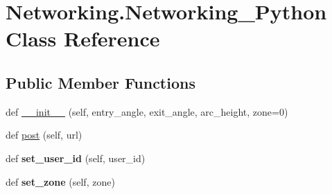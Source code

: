 \hypertarget{classNetworking_1_1Networking__Python}{}\section{Networking.\+Networking\+\_\+\+Python Class Reference}
\label{classNetworking_1_1Networking__Python}
\subsection*{Public Member Functions}
\begin{DoxyCompactItemize}
\item 
def \hyperlink{classNetworking_1_1Networking__Python_ad8b3ecf029eb27fbfa4557488cd7ecb5}{\+\_\+\+\_\+init\+\_\+\+\_\+} (self, entry\+\_\+angle, exit\+\_\+angle, arc\+\_\+height, zone=0)
\item 
def \hyperlink{classNetworking_1_1Networking__Python_a56516bc36d4a0991e4a4c90ae8248e48}{post} (self, url)
\item 
\mbox{\label{classNetworking_1_1Networking__Python_a230184041347e0efef8a05a1afaf8df9}} 
def {\bfseries set\+\_\+user\+\_\+id} (self, user\+\_\+id)
\item 
\mbox{\label{classNetworking_1_1Networking__Python_ae65cc65977d47ac894cc8804059915ec}} 
def {\bfseries set\+\_\+zone} (self, zone)
\end{DoxyCompactItemize}
